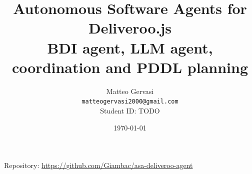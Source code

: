 \documentclass[10pt,a4paper]{article}
\title{Autonomous Software Agents for Deliveroo.js\\
  \large BDI agent, LLM agent, coordination and PDDL planning}
\author{
  Matteo Gervasi \\ \texttt{matteogervasi2000@gmail.com} \\ Student ID: TODO
}
\date{\today}
\begin{document}
\maketitle

\begin{center}
  Repository: \url{https://github.com/Giambac/asa-deliveroo-agent}
\end{center}









\end{document}
